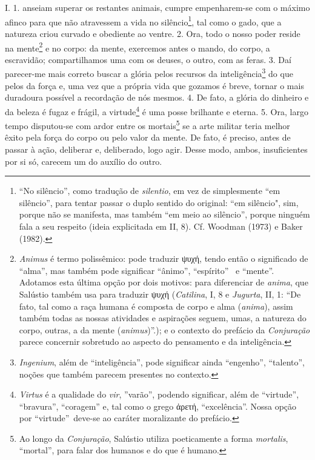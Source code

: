 \part{\titulo}


\chapter*{}


I. 1.  anseiam superar os restantes animais, cumpre
empenharem-se com o máximo afinco para que não atravessem a vida no
silêncio\footnote{``No silêncio'', como tradução de \emph{silentio}, em vez de
simplesmente ``em silêncio'', para tentar passar o duplo sentido do original:
``em silêncio", sim, porque não se manifesta, mas também ``em meio ao
silêncio'', porque ninguém fala a seu respeito (ideia explicitada em II, 8).
Cf. Woodman (1973) e Baker (1982).}, tal como o gado, que a natureza criou
curvado e obediente ao ventre. 2. Ora, todo o nosso poder reside na
mente\footnote{\emph{Animus} é termo polissêmico: pode traduzir 
\grego ψυχή, tendo então o significado de ``alma'', mas
também pode significar ``ânimo'', ``espírito'' \ e ``mente''. Adotamos esta
última opção por dois motivos: para diferenciar de  \emph{anima}, que Salústio
também usa para traduzir \grego ψυχή
 (\emph{Catilina},
I, 8 e \emph{Jugurta}, II, 1: ``De fato, tal como a raça humana é composta de
corpo e alma (\emph{anima}), assim também todas as nossas atividades e
aspirações seguem, umas, a natureza do corpo, outras, a da mente
(\emph{animus})''.); e o contexto do prefácio da \emph{Conjuração} parece
concernir sobretudo ao aspecto do pensamento e da inteligência.} 
e no corpo: da
mente, exercemos antes o mando, do corpo, a escravidão; compartilhamos uma com
os deuses, o outro, com as feras. 3. Daí parecer-me mais correto buscar a
glória pelos recursos da inteligência\footnote{\emph{Ingenium}, além de
``inteligência'', pode  significar ainda ``engenho'', ``talento'', noções que
também parecem presentes no contexto.} do que pelos da força e, uma vez que a
própria vida que gozamos é breve, tornar o mais duradoura possível a recordação
de nós mesmos. 4. De fato, a glória do dinheiro e da beleza é fugaz e frágil, a
virtude\footnote{\emph{Virtus} é a qualidade do \emph{vir}, ''varão'', podendo
significar, além de ``virtude'', ``bravura'', ``coragem'' e, tal como o grego
\grego ἀρετή, ``excelência''. Nossa opção por
``virtude''\ deve-se ao caráter moralizante do prefácio.} é uma posse brilhante
e eterna. 5. Ora, largo tempo disputou-se com ardor entre os
mortais\footnote{Ao longo da \emph{Conjuração}, Salústio utiliza poeticamente a
forma \emph{mortalis}, ``mortal'', para falar dos humanos e do que é humano.}
se a arte militar teria melhor êxito pela força do corpo ou pelo valor da
mente. De fato, é preciso, antes de passar à ação, deliberar e, deliberado,
logo agir. Desse modo, ambos, insuficientes por si só, carecem um do auxílio do
outro.

